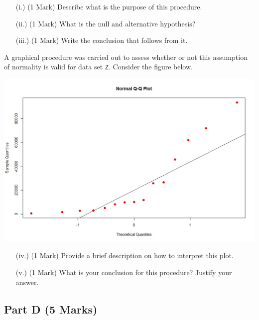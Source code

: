 \documentclass[a4paper,12pt]{article}
\begin{document}
\begin{itemize}
	\item[(i.)] (1 Mark) Describe what is the purpose of this procedure.
	\item[(ii.)] (1 Mark) What is the null and alternative hypothesis?
	\item[(iii.)] (1 Mark) Write the conclusion that follows from it.
\end{itemize}


\noindent A graphical procedure was carried out to assess whether or not this assumption of normality is valid for data set \texttt{Z}. Consider the figure below.

\begin{center}
	\includegraphics[scale=0.45]{images/MT2016-QQPLOT}
\end{center}

\begin{itemize}
	\item[(iv.)] (1 Mark) Provide a brief description on how to interpret this plot.
	\item[(v.)] (1 Mark) What is your conclusion for this procedure? Justify your answer.
\end{itemize}


\subsection*{Part D (5 Marks)}

\end{document}
